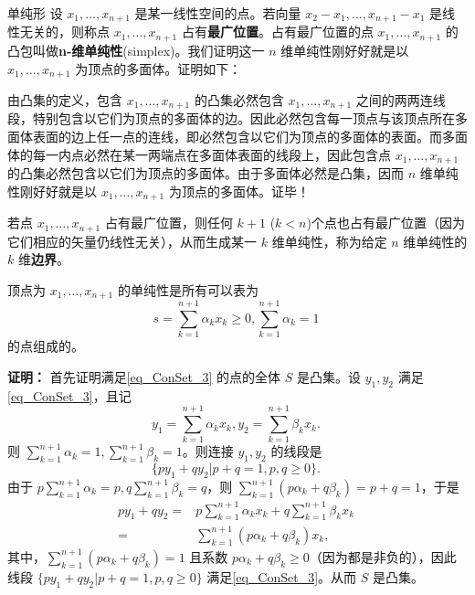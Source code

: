 \begin{example}{单纯形}
设 $x_1,\ldots,x_{n+1}$ 是某一线性空间的点。若向量 $x_2-x_1,\ldots,x_{n+1}-x_1$ 是线性无关的，则称点 $x_1,\ldots,x_{n+1}$ 占有\textbf{最广位置}。占有最广位置的点 $x_1,\ldots,x_{n+1}$ 的凸包叫做\textbf{n-维单纯性}(simplex)。我们证明这一 $n$ 维单纯性刚好好就是以 $x_1,\ldots,x_{n+1}$ 为顶点的多面体。证明如下：

由凸集的定义，包含 $x_1,\ldots,x_{n+1}$ 的凸集必然包含 $x_1,\ldots,x_{n+1}$ 之间的两两连线段，特别包含以它们为顶点的多面体的边。因此必然包含每一顶点与该顶点所在多面体表面的边上任一点的连线，即必然包含以它们为顶点的多面体的表面。而多面体的每一内点必然在某一两端点在多面体表面的线段上，因此包含点 $x_1,\ldots,x_{n+1}$ 的凸集必然包含以它们为顶点的多面体。由于多面体必然是凸集，因而
 $n$ 维单纯性刚好好就是以 $x_1,\ldots,x_{n+1}$ 为顶点的多面体。证毕！

若点 $x_1,\ldots,x_{n+1}$ 占有最广位置，则任何 $k+1$ ($k<n$)个点也占有最广位置（因为它们相应的矢量仍线性无关），从而生成某一 $k$ 维单纯性，称为给定 $n$ 维单纯性的 $k$ 维\textbf{边界}。
\end{example}

\begin{theorem}{}
顶点为  $x_1,\ldots,x_{n+1}$ 的单纯性是所有可以表为
\begin{equation}\label{eq_ConSet_3}
s=\sum_{k=1}^{n+1} \alpha_k x_k\geq0,\sum_{k=1}^{n+1}\alpha_k=1~
\end{equation}
的点组成的。
\end{theorem}

\textbf{证明：}
首先证明满足\autoref{eq_ConSet_3} 的点的全体 $S$ 是凸集。设 $y_1,y_2$ 满足\autoref{eq_ConSet_3}，且记
\begin{equation}
y_1=\sum_{k=1}^{n+1} \alpha_k x_k,y_2=\sum_{k=1}^{n+1} \beta_k x_k.~
\end{equation}
则 $\sum_{k=1}^{n+1}\alpha_k=1,\sum_{k=1}^{n+1}\beta_k=1$。则连接 $y_1,y_2$ 的线段是
\begin{equation}
\{py_1+qy_2|p+q=1,p,q\geq0\}.~
\end{equation}
由于 $p\sum_{k=1}^{n+1}\alpha_k=p,q\sum_{k=1}^{n+1}\beta_k=q$，则 $\sum_{k=1}^{n+1}(p\alpha_k +q\beta_k)=p+q=1$，于是
\begin{equation}
\begin{aligned}
py_1+qy_2=&p\sum_{k=1}^{n+1} \alpha_k x_k+q\sum_{k=1}^{n+1} \beta_k x_k\\
=&\sum_{k=1}^{n+1}(p\alpha_k +q\beta_k) x_k,
\end{aligned}~
\end{equation}
其中，$\sum_{k=1}^{n+1}(p\alpha_k +q\beta_k)=1$ 且系数 $p\alpha_k +q\beta_k\geq0$（因为都是非负的），因此线段 $\{py_1+qy_2|p+q=1,p,q\geq0\}$ 满足\autoref{eq_ConSet_3}。从而 $S$ 是凸集。

